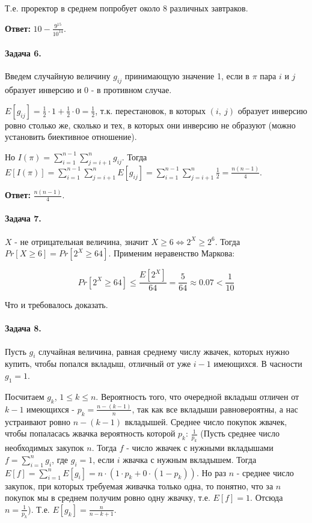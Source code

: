 \documentclass{article}
\newcommand{\pair}[2]{(#1,\ #2)}
\newcommand{\half}[1]{\frac{#1}{2}}
\begin{document}
    Т.е. проректор в среднем попробует около 8 различных завтраков.

    \textbf{Ответ:} $10 - \frac{9^{15}}{10^{14}}$.


    \paragraph{Задача 6.}
    Введем случайную величину $g_{ij}$ принимающую значение 1, если в $\pi$
    пара $i$ и $j$ образует инверсию и 0 - в противном случае.

    $E[g_{ij}] = \frac{1}{2} \cdot 1 + \frac{1}{2} \cdot 0 = \half{1}$, т.к. перестановок, в которых $\pair{i}{j}$ образует инверсию ровно столько же, сколько и тех, в которых они инверсию не образуют (можно установить биективное отношение).

    Но $I({\pi}) = \sum_{i=1}^{n - 1}\sum_{j=i + 1}^{n}g_{ij}$. Тогда 
    $E[I(\pi)] = \sum_{i=1}^{n - 1}\sum_{j=i + 1}^{n}E[g_{ij}] 
    = \sum_{i=1}^{n - 1}\sum_{j=i + 1}^{n} \half{1} = \frac{n(n-1)}{4}$.

    \textbf{Ответ:} $\frac{n(n-1)}{4}$.

    \paragraph{Задача 7.}
    $X$ - не отрицательная величина, значит $X \ge 6 \Leftrightarrow 2^X \ge 2^6.$ Тогда $Pr[X \ge 6] = Pr[2^X \ge 64]$. Применим неравенство Маркова:

    $$ Pr[2^X \ge 64] \le \frac{E[2^X]}{64} = \frac{5}{64} \approx 0.07 < \frac{1}{10}$$

    Что и требовалось доказать.

    \paragraph{Задача 8.}
    Пусть $g_i$ случайная величина, равная среднему числу жвачек, которых нужно купить, чтобы попался вкладыш, отличный от уже $i - 1$ имеющихся. В часности $g_1 = 1$.

    Посчитаем $g_k$, $1 \le k \le n$. Вероятность того, что очередной вкладыш отличен от $k - 1$ имеющихся - $p_k = \frac{n - (k - 1)}{n}$, так как все вкладыши равновероятны, а нас устраивают ровно $n - (k - 1)$ вкладышей. Среднее число покупок жвачек, чтобы попаласась жвачка вероятность которой $p_k$: $\frac{1}{p_k}$ (Пусть среднее число необходимых закупок $n$. Тогда $f$ - число жвачек с нужными вкладышами $f = \sum_{i=1}^{n}g_i$, где $g_i = 1$, если $i$ жвачка с нужным вкладышем. Тогда $E[f] = \sum_{i=1}^{n}E[g_i] = n \cdot (1 \cdot p_k + 0 \cdot (1 - p_k))$. Но раз $n$ - среднее число закупок, при которых требуемая живачка только одна, то понятно, что за $n$ покупок мы в среднем получим ровно одну жвачку, т.е. $E[f] = 1$. Отсюда $n = \frac{1}{p_k}$). Т.е. $E[g_k] = \frac{n}{n - k + 1}$.
\end{document}
